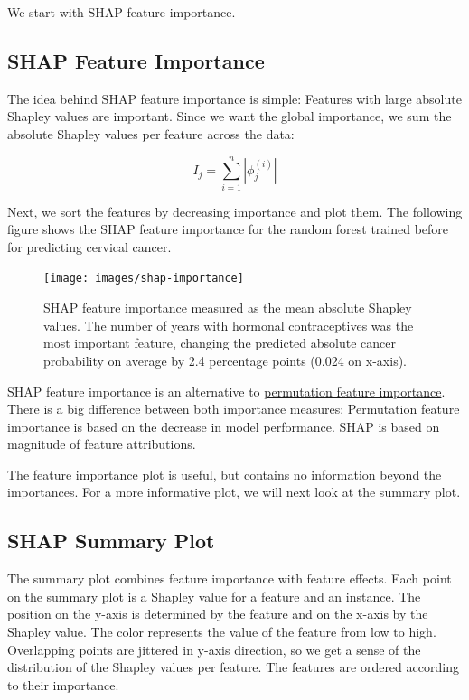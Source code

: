 \documentclass[
  12pt,
]{krantz}
\begin{document}
We start with SHAP feature importance.

\hypertarget{shap-feature-importance}{%
\subsection{SHAP Feature Importance}\label{shap-feature-importance}}

The idea behind SHAP feature importance is simple:
Features with large absolute Shapley values are important.
Since we want the global importance, we sum the absolute Shapley values per feature across the data:

\[I_j=\sum_{i=1}^n{}|\phi_j^{(i)}|\]

Next, we sort the features by decreasing importance and plot them.
The following figure shows the SHAP feature importance for the random forest trained before for predicting cervical cancer.

\begin{figure}

{\centering \texttt{[image: images/shap-importance]} 

}

\caption{SHAP feature importance measured as the mean absolute Shapley values. The number of years with hormonal contraceptives was the most important feature, changing the predicted absolute cancer probability on average by 2.4 percentage points (0.024 on x-axis).}\label{fig:unnamed-chunk-45}
\end{figure}

SHAP feature importance is an alternative to \protect\hyperlink{feature-importance}{permutation feature importance}.
There is a big difference between both importance measures:
Permutation feature importance is based on the decrease in model performance.
SHAP is based on magnitude of feature attributions.

The feature importance plot is useful, but contains no information beyond the importances.
For a more informative plot, we will next look at the summary plot.

\hypertarget{shap-summary-plot}{%
\subsection{SHAP Summary Plot}\label{shap-summary-plot}}

The summary plot combines feature importance with feature effects.
Each point on the summary plot is a Shapley value for a feature and an instance.
The position on the y-axis is determined by the feature and on the x-axis by the Shapley value.
The color represents the value of the feature from low to high.
Overlapping points are jittered in y-axis direction, so we get a sense of the distribution of the Shapley values per feature.
The features are ordered according to their importance.
\end{document}
